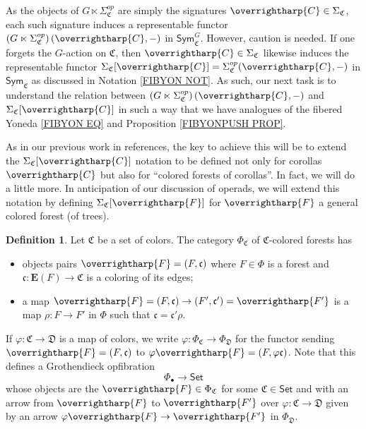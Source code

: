 \documentclass[a4paper,10pt
,draft
]{article}%
\numberwithin{equation}{section}
\numberwithin{figure}{section}
\theoremstyle{definition} %
\newtheorem{definition}[equation]{Definition}%
\newcommand{\vect}[1]{\text{\overrightharp{\ensuremath{#1}}}}
\newcommand{\1}{\ensuremath{\mathbbm 1}}%
\begin{document}
As the objects of 
$G \ltimes \Sigma^{op}_{\mathfrak{C}}$
are simply the signatures
$\vect{C} \in \Sigma_{\mathfrak{C}}$,
each such signature induces a representable functor
$\left(G \ltimes \Sigma^{op}_{\mathfrak{C}}\right)(\vect{C},-)$
in 
$\mathsf{Sym}^G_{\mathfrak{C}}$.
However, caution is needed.
If one forgets the $G$-action on $\mathfrak{C}$,
then $\vect{C} \in \Sigma_{\mathfrak{C}}$
likewise induces the representable functor 
$\Sigma_{\mathfrak{C}}[\vect{C}]=\Sigma^{op}_{\mathfrak{C}}(\vect{C},-)$
in 
$\mathsf{Sym}_{\mathfrak{C}}$
as discussed in Notation \ref{FIBYON NOT}.
%
As such, our next task is to understand the relation between 
$\left(G \ltimes \Sigma^{op}_{\mathfrak{C}}\right)(\vect{C},-)$
and 
$\Sigma_{\mathfrak{C}}[\vect{C}]$
in such a way that we have analogues of the 
fibered Yoneda \eqref{FIBYON EQ}
and Proposition \ref{FIBYONPUSH PROP}.


As in our previous work in {\color{red} references},
the key to achieve this will be to extend the
$\Sigma_{\mathfrak{C}}[\vect{C}]$
notation to be defined not only for corollas $\vect{C}$
but also for ``colored forests of corollas''.
In fact, we will do a little more. 
In anticipation of our discussion of operads, 
we will extend this notation by defining 
$\Sigma_{\mathfrak{C}}[\vect{F}]$
for $\vect{F}$ a general colored forest (of trees).


\begin{definition}\label{COLFOR DEF}
Let $\mathfrak{C}$ be a set of colors.
The category $\Phi_{\mathfrak{C}}$ of $\mathfrak{C}$-colored forests has
\begin{itemize}
\item objects pairs
$\vect{F} = (F,\mathfrak{c})$
where 
$F\in \Phi$ is a forest
and 
$\mathfrak{c}\colon \boldsymbol{E}(F) \to \mathfrak{C}$ 
is a coloring of its edges;
\item a map
$\vect{F}=(F,\mathfrak{c}) \to 
(F',\mathfrak{c}') = \vect{F'}$
is a map $\rho \colon F \to F'$ in $\Phi$
such that
$\mathfrak{c} = \mathfrak{c}' \rho$.
\end{itemize}
If $\varphi\colon \mathfrak{C} \to \mathfrak{D}$ is a map of colors,
we write
$\varphi \colon \Phi_{\mathfrak{C}} \to \Phi_{\mathfrak{D}}$
for the functor sending 
$\vect{F} = (F,\mathfrak{c})$
to 
$\varphi\vect{F} = (F,\varphi\mathfrak{c})$.
Note that this defines a Grothendieck opfibration
\begin{equation}\label{PHIBGRO EQ}
\Phi_{\bullet} \to \mathsf{Set}
\end{equation}
whose objects are the $\vect{F} \in \Phi_{\mathfrak{C}}$ for some
$\mathfrak{C} \in \mathsf{Set}$
and with an arrow
from $\vect{F}$ to $\vect{F'}$
over
$\varphi \colon \mathfrak{C} \to \mathfrak{D}$
given by an arrow
$\varphi \vect{F} \to \vect{F'}$ in $\Phi_{\mathfrak{D}}$.
\end{definition}
\end{document}
